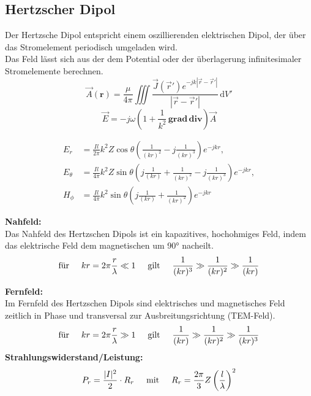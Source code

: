 \documentclass[german]{latex4ei/latex4ei_sheet}
\begin{document}
\subsection{Hertzscher Dipol}
\begin{sectionbox}
    Der Hertzsche Dipol entspricht einem oszillierenden elektrischen Dipol, der
    über das Stromelement periodisch umgeladen wird. \\

    Das Feld lässt sich aus der dem Potential oder der überlagerung infinitesimaler Stromelemente berechnen. \\
    \[
\vec{A}(\mathbf{r}) = \frac{\mu}{4 \pi} \iiint \frac{\vec{J}(\vec{r}') e^{-j k |\vec{r} - \vec{r}'|}}{|\vec{r} - \vec{r}'|} \, \mathrm{d}V'
\]
\[
\vec{E} = -j \omega \left( 1 + \frac{1}{k^2} \, \mathbf{grad} \, \mathbf{div} \right) \vec{A}
\]



\begin{align*}
E_r &= \frac{I l}{2 \pi} k^2 Z \cos\theta \left( \frac{1}{(kr)^2} - j \frac{1}{(kr)^3} \right) e^{-jkr}, \\
E_\theta &= \frac{I l}{4 \pi} k^2 Z \sin\theta \left( j \frac{1}{(kr)} + \frac{1}{(kr)^2} - j \frac{1}{(kr)^3} \right) e^{-jkr}, \\
H_\phi &= \frac{I l}{4 \pi} k^2 \sin\theta \left( j \frac{1}{(kr)} + \frac{1}{(kr)^2} \right) e^{-jkr}
\end{align*}


    \textbf{Nahfeld:}\\ 
    Das Nahfeld des Hertzschen Dipols ist ein kapazitives, hochohmiges Feld,
    indem das elektrische Feld dem magnetischen um 90° nacheilt.
    \[
        \text{für} \hspace{5mm} kr = 2 \pi \frac{r}{\lambda} \ll 1 \hspace{5mm} \text{gilt} \hspace{5mm} \frac{1}{(kr)^3} \gg \frac{1}{(kr)^2} \gg \frac{1}{(kr)}
    \]

    \textbf{Fernfeld:}\\
    Im Fernfeld des Hertzschen Dipols sind elektrisches und magnetisches Feld
    zeitlich in Phase und transversal zur Ausbreitungsrichtung (TEM-Feld).
    \[
        \text{für} \hspace{5mm} kr = 2 \pi \frac{r}{\lambda} \gg 1 \hspace{5mm} \text{gilt} \hspace{5mm} \frac{1}{(kr)} \gg \frac{1}{(kr)^2} \gg \frac{1}{(kr)^3}
    \]
    \textbf{Strahlungswiderstand/Leistung:}\\
    \[
        P_r = \frac{|I|^2}{2} \cdot R_r \hspace{5mm}  \text{mit} \hspace{5mm} R_r =  \frac{2 \pi}{3} Z \left(\frac{l}{\lambda}\right)^2
    \]

\end{sectionbox}
\end{document}
